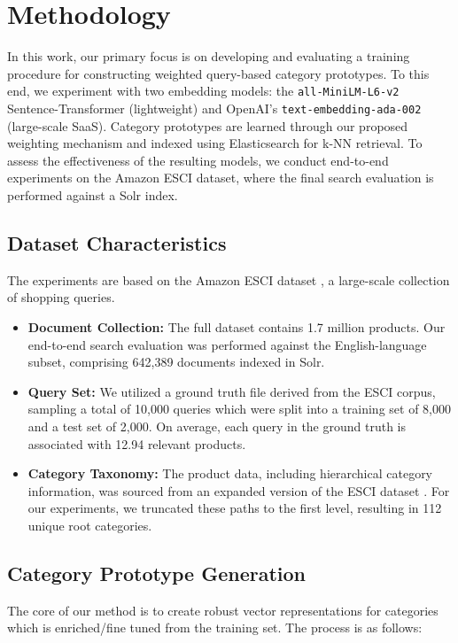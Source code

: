 \documentclass[12pt, a4paper]{article}
\begin{document}
\section{Methodology}

In this work, our primary focus is on developing and evaluating a training procedure for constructing weighted query-based category prototypes. To this end, we experiment with two embedding models: the \texttt{all-MiniLM-L6-v2} Sentence-Transformer (lightweight) and OpenAI's \texttt{text-embedding-ada-002} (large-scale SaaS). Category prototypes are learned through our proposed weighting mechanism and indexed using Elasticsearch for k-NN retrieval. To assess the effectiveness of the resulting models, we conduct end-to-end experiments on the Amazon ESCI dataset, where the final search evaluation is performed against a Solr index.

\subsection{Dataset Characteristics}

The experiments are based on the Amazon ESCI dataset \cite{reddy2020shopping}, a large-scale collection of shopping queries.
\begin{itemize}
\item \textbf{Document Collection:} The full dataset contains 1.7 million products. Our end-to-end search evaluation was performed against the English-language subset, comprising 642,389 documents indexed in Solr.
\item \textbf{Query Set:} We utilized a ground truth file derived from the ESCI corpus, sampling a total of 10,000 queries which were split into a training set of 8,000 and a test set of 2,000. On average, each query in the ground truth is associated with 12.94 relevant products.
\item \textbf{Category Taxonomy:} The product data, including hierarchical category information, was sourced from an expanded version of the ESCI dataset \cite{escis_dataset}. For our experiments, we truncated these paths to the first level, resulting in 112 unique root categories.
\end{itemize}

\subsection{Category Prototype Generation}

The core of our method is to create robust vector representations for categories which is enriched/fine tuned from the training set. The process is as follows:
\end{document}
